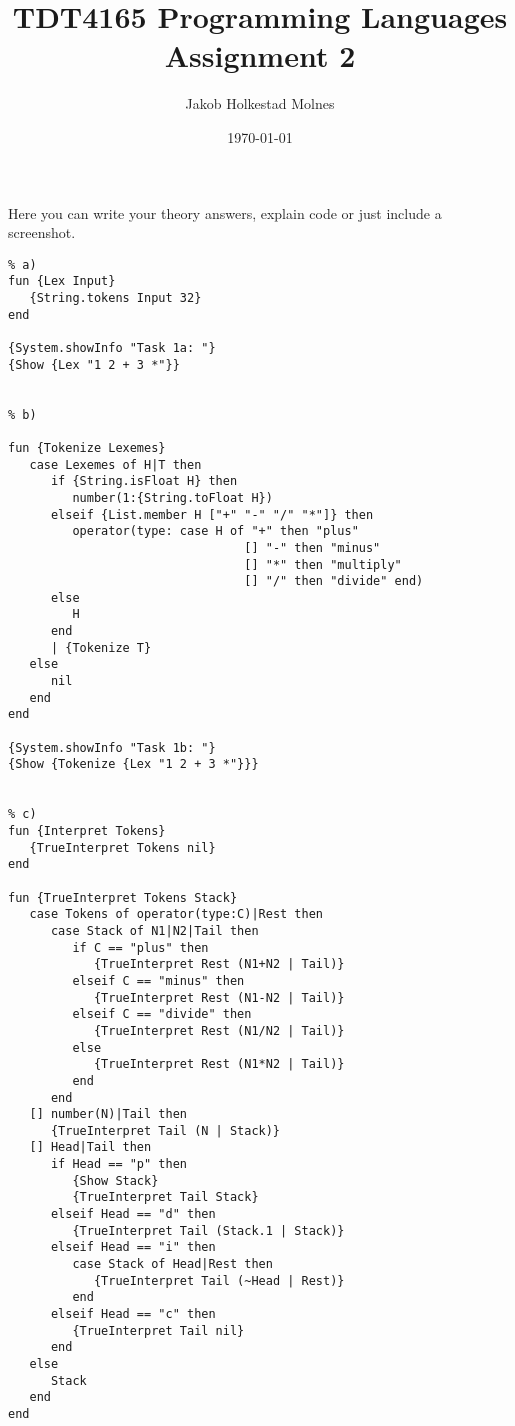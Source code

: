 \documentclass[11pt,a4paper]{report}
\title{TDT4165 Programming Languages Assignment 2}
\author{Jakob Holkestad Molnes}
\date{\today}
\begin{document}
\maketitle

\section{}
Here you can write your theory answers, explain code or just include a screenshot.


\begin{lstlisting}[language=Oz]
    % Task 1
% a)
fun {Lex Input}
   {String.tokens Input 32}
end

{System.showInfo "Task 1a: "}
{Show {Lex "1 2 + 3 *"}}


% b)

fun {Tokenize Lexemes}
   case Lexemes of H|T then
      if {String.isFloat H} then
         number(1:{String.toFloat H})
      elseif {List.member H ["+" "-" "/" "*"]} then
         operator(type: case H of "+" then "plus"
                                 [] "-" then "minus"
                                 [] "*" then "multiply"
                                 [] "/" then "divide" end)
      else 
         H
      end
      | {Tokenize T}
   else 
      nil
   end
end

{System.showInfo "Task 1b: "}
{Show {Tokenize {Lex "1 2 + 3 *"}}}


% c)
fun {Interpret Tokens}
   {TrueInterpret Tokens nil}
end

fun {TrueInterpret Tokens Stack}
   case Tokens of operator(type:C)|Rest then
      case Stack of N1|N2|Tail then
         if C == "plus" then
            {TrueInterpret Rest (N1+N2 | Tail)}
         elseif C == "minus" then
            {TrueInterpret Rest (N1-N2 | Tail)}
         elseif C == "divide" then
            {TrueInterpret Rest (N1/N2 | Tail)}
         else
            {TrueInterpret Rest (N1*N2 | Tail)}
         end
      end
   [] number(N)|Tail then
      {TrueInterpret Tail (N | Stack)}
   [] Head|Tail then
      if Head == "p" then 
         {Show Stack}
         {TrueInterpret Tail Stack}
      elseif Head == "d" then
         {TrueInterpret Tail (Stack.1 | Stack)}
      elseif Head == "i" then
         case Stack of Head|Rest then
            {TrueInterpret Tail (~Head | Rest)}
         end
      elseif Head == "c" then
         {TrueInterpret Tail nil}
      end
   else
      Stack
   end
end



\end{lstlisting}
\end{document}
